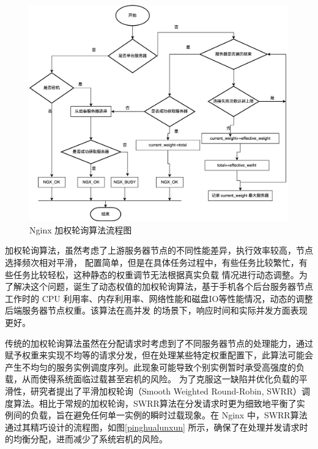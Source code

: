 \begin{figure}[htb]
	\centering
	\includegraphics[width=\textwidth]{figures/round-flowchart.png}
	\caption{Nginx 加权轮询算法流程图}
	\label{weight_round}
\end{figure}

加权轮询算法，虽然考虑了上游服务器节点的不同性能差异，执行效率较高，节点选择频次相对平滑，
配置简单，但是在具体任务过程中，有些任务比较繁忙，有些任务比较轻松，这种静态的权重调节无法根据真实负载
情况进行动态调整。为了解决这个问题，诞生了动态权值的加权轮询算法，基于手机各个后台服务器节点工作时的 CPU
利用率、内存利用率、网络性能和磁盘IO等性能情况，动态的调整后端服务器节点权重\cite{谭畅2021云中心基于}。该算法在高并发
的场景下，响应时间和实际并发方面表现更好。

传统的加权轮询算法虽然在分配请求时考虑到了不同服务器节点的处理能力，通过赋予权重来实现不均等的请求分发，但在处理某些特定权重配置下，此算法可能会产生不均匀的服务实例调度序列。此现象可能导致个别实例暂时承受高强度的负载，从而使得系统面临过载甚至宕机的风险。
为了克服这一缺陷并优化负载的平滑性，研究者提出了平滑加权轮询（Smooth Weighted Round-Robin, SWRR）调度算法。相比于常规的加权轮询，SWRR算法在分发请求时更为细致地平衡了实例间的负载，旨在避免任何单一实例的瞬时过载现象。在 Nginx 中，SWRR算法通过其精巧设计的流程图，如图\ref{pinghualunxun} 所示，确保了在处理并发请求时的均衡分配，进而减少了系统宕机的风险。

